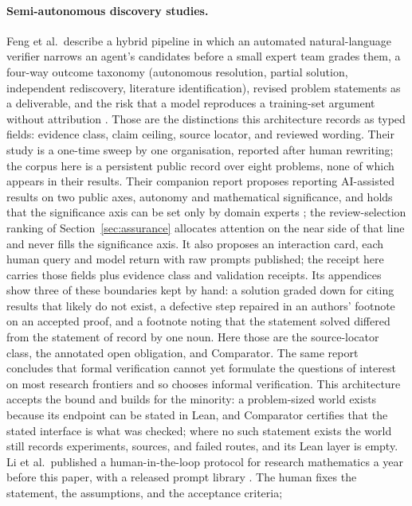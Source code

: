 \documentclass[10pt]{article}
\begin{document}
\paragraph{Semi-autonomous discovery studies.}
Feng et al.\ describe a hybrid pipeline in which an automated
natural-language verifier narrows an agent's candidates before a small expert
team grades them, a four-way outcome taxonomy (autonomous resolution, partial
solution, independent rediscovery, literature identification), revised
problem statements as a deliverable, and the risk that a model reproduces a
training-set argument without attribution \cite{aletheia}. Those are the
distinctions this architecture records as typed fields: evidence class, claim
ceiling, source locator, and reviewed wording. Their study is a one-time
sweep by one organisation, reported after human rewriting; the corpus here is
a persistent public record over eight problems, none of which appears in
their results. Their companion report proposes reporting AI-assisted results
on two public axes, autonomy and mathematical significance, and holds that
the significance axis can be set only by domain experts
\cite{autonomousmath}; the review-selection ranking of
Section~\ref{sec:assurance} allocates attention on the near side of that
line and never fills the significance axis. It also proposes an
interaction card, each human query and model return with raw prompts
published; the receipt here carries those fields plus evidence class and
validation receipts. Its appendices show three of
these boundaries kept by hand: a solution graded down for citing results
that likely do not exist, a defective step repaired in an authors' footnote
on an accepted proof, and a footnote noting that the statement solved
differed from the statement of record by one noun. Here those are the
source-locator class, the annotated open obligation, and Comparator. The
same report concludes that formal verification cannot yet formulate the
questions of interest on most research frontiers and so chooses informal
verification. This architecture accepts the bound and builds for the
minority: a problem-sized world exists because its endpoint can be stated in
Lean, and Comparator certifies that the stated interface is what was
checked; where no such statement exists the world still records
experiments, sources, and failed routes, and its Lean layer is empty.
Li et al.\ published a human-in-the-loop protocol for research mathematics
a year before this paper, with a released prompt library \cite{lihai}. The
human fixes the statement, the assumptions, and the acceptance criteria;
\end{document}
